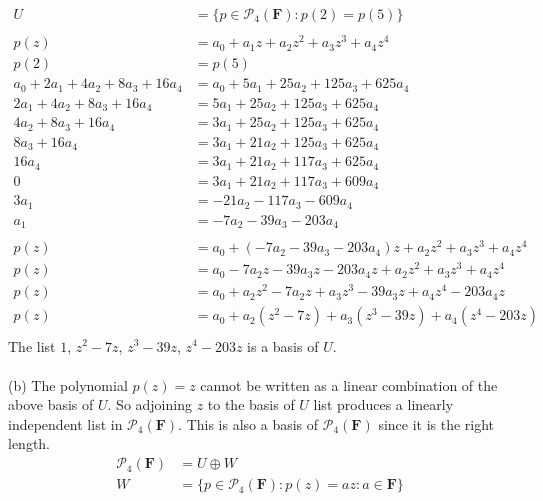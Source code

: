 \documentclass{article}
\begin{document}
\Large
\begin{align*}
\tag{a}
U &= \{p \in \mathcal{P}_4(\textbf{F}) : p(2) = p(5)\} \\
\\
p(z) &= a_0 + a_1z + a_2z^2 + a_3z^3 + a_4z^4 \\
p(2) &= p(5) \\
a_0 + 2a_1 + 4a_2 + 8a_3 + 16a_4
  &= a_0 + 5a_1 + 25a_2 + 125a_3 + 625a_4 \\
2a_1 + 4a_2 + 8a_3 + 16a_4
  &= 5a_1 + 25a_2 + 125a_3 + 625a_4 \\
4a_2 + 8a_3 + 16a_4
  &= 3a_1 + 25a_2 + 125a_3 + 625a_4 \\
8a_3 + 16a_4
  &= 3a_1 + 21a_2 + 125a_3 + 625a_4 \\
16a_4 &= 3a_1 + 21a_2 + 117a_3 + 625a_4 \\
0 &= 3a_1 + 21a_2 + 117a_3 + 609a_4 \\
3a_1 &= -21a_2 - 117a_3 - 609a_4 \\
a_1 &= -7a_2 - 39a_3 - 203a_4 \\
\\
p(z) &= a_0 + (-7a_2 - 39a_3 - 203a_4)z + a_2z^2 + a_3z^3 + a_4z^4 \\
p(z) &= a_0 - 7a_2z - 39a_3z - 203a_4z + a_2z^2 + a_3z^3 + a_4z^4 \\
p(z) &= a_0 + a_2z^2 - 7a_2z + a_3z^3 - 39a_3z + a_4z^4 - 203a_4z \\
p(z) &= a_0 + a_2(z^2 - 7z) + a_3(z^3 - 39z) + a_4(z^4 - 203z) \\
\end{align*}
The list $1$, $z^2 - 7z$, $z^3 - 39z$, $z^4 - 203z$ is a basis of $U$.
\\
\\
(b) The polynomial $p(z)=z$ cannot be written as a linear combination of the above basis of $U$.
So adjoining $z$ to the basis of $U$ list produces a linearly independent list in $\mathcal{P}_4(\textbf{F})$. This is also a basis of $\mathcal{P}_4(\textbf{F})$ since it is the right length.
\\
\begin{align*}
\tag{c}
\mathcal{P}_4(\textbf{F}) &= U \oplus W \\
W &= \{ p \in \mathcal{P}_4(\textbf{F}) : p(z) = az : a \in \textbf{F} \} \\
\end{align*}
\end{document}
